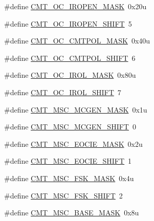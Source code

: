 \begin{DoxyCompactItemize}
\item 
\#define \hyperlink{group___c_m_t___register___masks_ga7f61dcc57756388d9e913eb3653c2e58}{C\+M\+T\+\_\+\+O\+C\+\_\+\+I\+R\+O\+P\+E\+N\+\_\+\+M\+A\+SK}~0x20u
\item 
\#define \hyperlink{group___c_m_t___register___masks_ga0d1d56279862ab5f549e82bd9c25b0f2}{C\+M\+T\+\_\+\+O\+C\+\_\+\+I\+R\+O\+P\+E\+N\+\_\+\+S\+H\+I\+FT}~5
\item 
\#define \hyperlink{group___c_m_t___register___masks_ga8096ee7b689f4a27e80c6d13f4097587}{C\+M\+T\+\_\+\+O\+C\+\_\+\+C\+M\+T\+P\+O\+L\+\_\+\+M\+A\+SK}~0x40u
\item 
\#define \hyperlink{group___c_m_t___register___masks_gaa20b0e3e0a6bc7db56b8c87f1fa24fb8}{C\+M\+T\+\_\+\+O\+C\+\_\+\+C\+M\+T\+P\+O\+L\+\_\+\+S\+H\+I\+FT}~6
\item 
\#define \hyperlink{group___c_m_t___register___masks_gadb4b1905fcea060fccf7c4486db6908f}{C\+M\+T\+\_\+\+O\+C\+\_\+\+I\+R\+O\+L\+\_\+\+M\+A\+SK}~0x80u
\item 
\#define \hyperlink{group___c_m_t___register___masks_gae67f5985213b34945cc357cfde809125}{C\+M\+T\+\_\+\+O\+C\+\_\+\+I\+R\+O\+L\+\_\+\+S\+H\+I\+FT}~7
\item 
\#define \hyperlink{group___c_m_t___register___masks_ga009968608dc16f63225cbfa192f0e159}{C\+M\+T\+\_\+\+M\+S\+C\+\_\+\+M\+C\+G\+E\+N\+\_\+\+M\+A\+SK}~0x1u
\item 
\#define \hyperlink{group___c_m_t___register___masks_ga1245001d81145a1cede60ee0d98b9522}{C\+M\+T\+\_\+\+M\+S\+C\+\_\+\+M\+C\+G\+E\+N\+\_\+\+S\+H\+I\+FT}~0
\item 
\#define \hyperlink{group___c_m_t___register___masks_gab7f246dc8aa0260f2696a23de0482cef}{C\+M\+T\+\_\+\+M\+S\+C\+\_\+\+E\+O\+C\+I\+E\+\_\+\+M\+A\+SK}~0x2u
\item 
\#define \hyperlink{group___c_m_t___register___masks_gaa7fa1a5e01690a63a09459cca5b763d0}{C\+M\+T\+\_\+\+M\+S\+C\+\_\+\+E\+O\+C\+I\+E\+\_\+\+S\+H\+I\+FT}~1
\item 
\#define \hyperlink{group___c_m_t___register___masks_gae434ad9168835c6d9e4d941a90a568cb}{C\+M\+T\+\_\+\+M\+S\+C\+\_\+\+F\+S\+K\+\_\+\+M\+A\+SK}~0x4u
\item 
\#define \hyperlink{group___c_m_t___register___masks_ga73422722bbae07a50d0b2b473f5f9417}{C\+M\+T\+\_\+\+M\+S\+C\+\_\+\+F\+S\+K\+\_\+\+S\+H\+I\+FT}~2
\item 
\#define \hyperlink{group___c_m_t___register___masks_gac099af54e9456cad9c3343184d3e041a}{C\+M\+T\+\_\+\+M\+S\+C\+\_\+\+B\+A\+S\+E\+\_\+\+M\+A\+SK}~0x8u

\end{DoxyCompactItemize}
